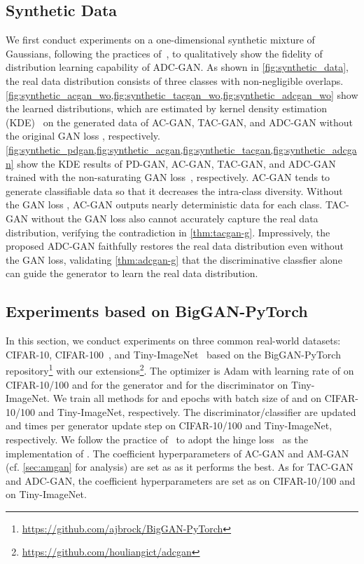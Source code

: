 \documentclass[nohyperref]{article}
\theoremstyle{plain}
\theoremstyle{definition}
\theoremstyle{remark}
\begin{document}
\subsection{Synthetic Data}\label{sec:synthetic}

We first conduct experiments on a one-dimensional synthetic mixture of Gaussians, following the practices of~\cite{NEURIPS2019_4ea06fbc}, to qualitatively show the fidelity of distribution learning capability of ADC-GAN.
As shown in \cref{fig:synthetic_data}, the real data distribution consists of three classes with non-negligible overlaps.
\cref{fig:synthetic_acgan_wo,fig:synthetic_tacgan_wo,fig:synthetic_adcgan_wo} show the learned distributions, which are estimated by kernel density estimation (KDE)~\cite{parzen1962estimation} on the generated data of AC-GAN, TAC-GAN, and ADC-GAN without the original GAN loss , respectively.
\cref{fig:synthetic_pdgan,fig:synthetic_acgan,fig:synthetic_tacgan,fig:synthetic_adcgan} show the KDE results of PD-GAN, AC-GAN, TAC-GAN, and ADC-GAN trained with the non-saturating GAN loss~\cite{NIPS2014_5ca3e9b1}, respectively.
AC-GAN tends to generate classifiable data so that it decreases the intra-class diversity.
Without the GAN loss , AC-GAN outputs nearly deterministic data for each class.
TAC-GAN without the GAN loss also cannot accurately capture the real data distribution, verifying the contradiction in \cref{thm:tacgan-g}.
Impressively, the proposed ADC-GAN faithfully restores the real data distribution even without the GAN loss, validating \cref{thm:adcgan-g} that the discriminative classfier alone can guide the generator to learn the real data distribution.

\subsection{Experiments based on BigGAN-PyTorch}

In this section, we conduct experiments on three common real-world datasets: CIFAR-10, CIFAR-100~\cite{krizhevsky2009learning}, and Tiny-ImageNet~\cite{le2015tiny} based on the BigGAN-PyTorch repository\footnote{\url{https://github.com/ajbrock/BigGAN-PyTorch}} with our extensions\footnote{\url{https://github.com/houliangict/adcgan}}.
The optimizer is Adam with learning rate of  on CIFAR-10/100 and  for the generator and  for the discriminator on Tiny-ImageNet.
We train all methods for  and  epochs with batch size of  and  on CIFAR-10/100 and Tiny-ImageNet, respectively.
The discriminator/classifier are updated  and  times per generator update step on CIFAR-10/100 and Tiny-ImageNet, respectively.
We follow the practice of~\cite{miyato2018cgans,NEURIPS2019_4ea06fbc} to adopt the hinge loss~\cite{lim2017geometric,NIPS2017_6f1d0705} as the implementation of .
The coefficient hyperparameters of AC-GAN and AM-GAN~\cite{zhou2018activation} (cf. \cref{sec:amgan} for analysis) are set as  as it performs the best.
As for TAC-GAN and ADC-GAN, the coefficient hyperparameters are set as  on CIFAR-10/100 and  on Tiny-ImageNet.
\end{document}

